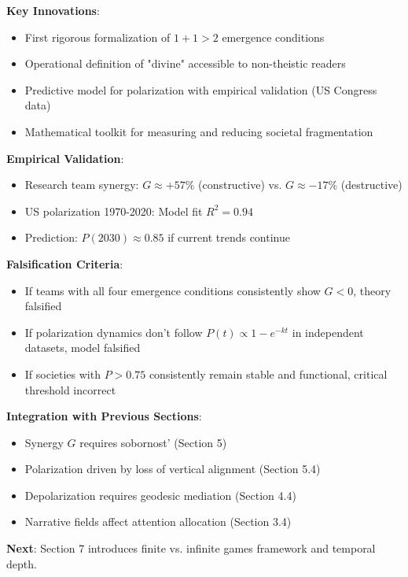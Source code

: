 \documentclass[11pt,a4paper]{article}
\theoremstyle{definition}
\theoremstyle{remark}
\begin{document}
\begin{enumerate}
\begin{mdframed}[backgroundcolor=green!10,linewidth=2pt,linecolor=green!70!black]
\textbf{Key Innovations}:
\begin{itemize}[nosep]
    \item First rigorous formalization of \(1+1>2\) emergence conditions
    \item Operational definition of "divine" accessible to non-theistic readers
    \item Predictive model for polarization with empirical validation (US Congress data)
    \item Mathematical toolkit for measuring and reducing societal fragmentation
\end{itemize}

\textbf{Empirical Validation}:
\begin{itemize}[nosep]
    \item Research team synergy: \(G \approx +57\%\) (constructive) vs. \(G \approx -17\%\) (destructive)
    \item US polarization 1970-2020: Model fit \(R^2 = 0.94\)
    \item Prediction: \(P(2030) \approx 0.85\) if current trends continue
\end{itemize}

\textbf{Falsification Criteria}:
\begin{itemize}[nosep]
    \item If teams with all four emergence conditions consistently show \(G < 0\), theory falsified
    \item If polarization dynamics don't follow \(P(t) \propto 1-e^{-kt}\) in independent datasets, model falsified
    \item If societies with \(P > 0.75\) consistently remain stable and functional, critical threshold incorrect
\end{itemize}

\textbf{Integration with Previous Sections}:
\begin{itemize}[nosep]
    \item Synergy \(G\) requires sobornost' (Section 5)
    \item Polarization driven by loss of vertical alignment (Section 5.4)
    \item Depolarization requires geodesic mediation (Section 4.4)
    \item Narrative fields affect attention allocation (Section 3.4)
\end{itemize}

\textbf{Next}: Section 7 introduces finite vs. infinite games framework and temporal depth.
\end{mdframed}


\end{enumerate}
\end{document}
